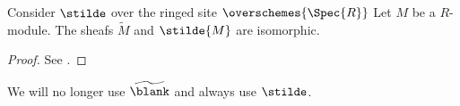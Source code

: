 \begin{lemma}
Consider $\stilde$ over the ringed site $\overschemes{\Spec{R}}$
Let $M$ be a $R$-module.
The sheafs $\widetilde{M}$ and $\stilde{M}$ are isomorphic.
\end{lemma}
\begin{proof}
See \cite[Tag 01HR]{stacks-project}.
\end{proof}

We will no longer use $\widetilde{\blank}$ and always use $\stilde$.